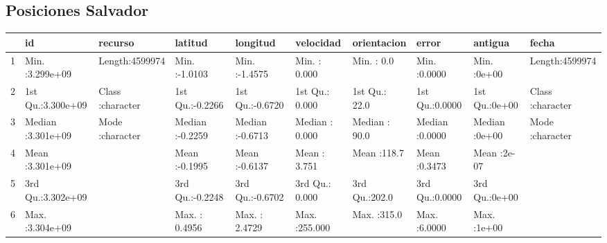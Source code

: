 \documentclass{article}
\begin{document}
\subsection{Posiciones Salvador}
\begin{table}[ht]
\centering
  \begin{tabular}{rlllllllll}
    \hline
   &       id &   recurso &    latitud &    longitud &   velocidad &  orientacion &     error &    antigua &    fecha \\ 
    \hline
  1 & Min.   :3.299e+09   & Length:4599974     & Min.   :-1.0103   & Min.   :-1.4575   & Min.   :  0.000   & Min.   :  0.0   & Min.   :0.0000   & Min.   :0e+00   & Length:4599974     \\ 
    2 & 1st Qu.:3.300e+09   & Class :character   & 1st Qu.:-0.2266   & 1st Qu.:-0.6720   & 1st Qu.:  0.000   & 1st Qu.: 22.0   & 1st Qu.:0.0000   & 1st Qu.:0e+00   & Class :character   \\ 
    3 & Median :3.301e+09   & Mode  :character   & Median :-0.2259   & Median :-0.6713   & Median :  0.000   & Median : 90.0   & Median :0.0000   & Median :0e+00   & Mode  :character   \\ 
    4 & Mean   :3.301e+09   &  & Mean   :-0.1995   & Mean   :-0.6137   & Mean   :  3.751   & Mean   :118.7   & Mean   :0.3473   & Mean   :2e-07   &  \\ 
    5 & 3rd Qu.:3.302e+09   &  & 3rd Qu.:-0.2248   & 3rd Qu.:-0.6702   & 3rd Qu.:  0.000   & 3rd Qu.:202.0   & 3rd Qu.:0.0000   & 3rd Qu.:0e+00   &  \\ 
    6 & Max.   :3.304e+09   &  & Max.   : 0.4956   & Max.   : 2.4729   & Max.   :255.000   & Max.   :315.0   & Max.   :6.0000   & Max.   :1e+00   &  \\ 
     \hline
  \end{tabular}
\end{table}
  
  
\end{document}
